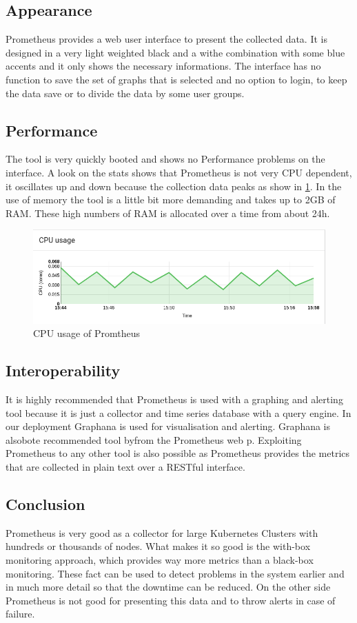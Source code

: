 \subsection{Appearance}%
Prometheus provides a web user interface to present the collected data. It is designed in a very light weighted black and a withe combination with some blue accents and it only shows the necessary informations. The interface has no function to save the set of graphs that is selected and no option to login, to keep the data save or to divide the data by some user groups.   
\subsection{Performance}
The tool is very quickly booted and shows no Performance problems on the interface. A look on the stats shows that Prometheus is not very CPU dependent, it oscillates up and down because the collection data peaks as show in \cref{fig:Prometeus_Cpu}. In the use of memory the tool is a little bit more demanding and takes up to 2GB of RAM. These high numbers of RAM is allocated over a time from about 24h. 
\begin{figure}
\centering
\includegraphics[width=0.5\linewidth]{Bilder/Performance/Prometeus_Cpu}
\caption{CPU usage of Promtheus}
\label{fig:Prometeus_Cpu}
\end{figure}
\subsection{Interoperability}
It is highly recommended that Prometheus is used with a graphing and alerting tool because it is just a collector and time series database with a query engine. In our deployment Graphana is used for visualisation and alerting. Graphana is alsobote recommended tool byfrom the Prometheus web p\cite{prometheus}. Exploiting Prometheus to any other tool is also possible as Prometheus provides the metrics that are collected in plain text over a RESTful interface.
\subsection{Conclusion}
Prometheus is very good as a collector for large Kubernetes Clusters with hundreds or thousands of nodes. What makes it so good is the with-box monitoring approach, which provides way more metrics than a black-box monitoring. These fact can be used to detect problems in the system earlier and in much more detail so that the downtime can be reduced. On the other side Prometheus is not good for presenting this data and to throw alerts in case of failure.

